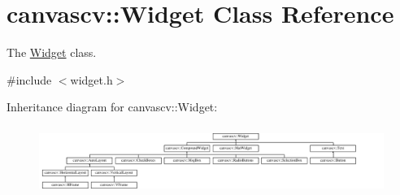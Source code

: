 \hypertarget{classcanvascv_1_1Widget}{}\section{canvascv\+:\+:Widget Class Reference}
\label{classcanvascv_1_1Widget}


The \hyperlink{classcanvascv_1_1Widget}{Widget} class.  




{\ttfamily \#include $<$widget.\+h$>$}

Inheritance diagram for canvascv\+:\+:Widget\+:\begin{figure}[H]
\begin{center}
\leavevmode
\includegraphics[height=2.234637cm]{classcanvascv_1_1Widget}
\end{center}
\end{figure}
